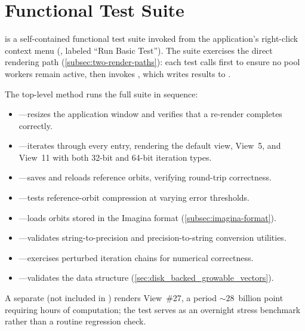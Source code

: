 \section{Functional Test Suite}
\label{subsec:crummy-test}

 is a self-contained functional test suite invoked
from the application's right-click context menu
(, labeled ``Run Basic Test'').  The suite
exercises the direct rendering path
(\cref{subsec:two-render-paths}): each test calls 
first to ensure no pool workers remain active, then invokes
, which writes results to .

The top-level  method runs the full suite in sequence:
\begin{itemize}
  \item {}---resizes the application window and
        verifies that a re-render completes correctly.
  \item {}---iterates through every
         entry, rendering the default view,
        View~5, and View~11 with both 32-bit and 64-bit iteration
        types.
  \item {}---saves and reloads reference orbits,
        verifying round-trip correctness.
  \item {}---tests reference-orbit
        compression at varying error thresholds.
  \item {}---loads orbits stored in the Imagina
        format (\cref{subsec:imagina-format}).
  \item {}---validates string-to-precision
        and precision-to-string conversion utilities.
  \item {}---exercises perturbed iteration
        chains for numerical correctness.
  \item {}---validates the
         data structure
        (\cref{sec:disk_backed_growable_vectors}).
\end{itemize}
A separate  (not included in
) renders View~\#27, a period ${\sim}28$~billion point
requiring hours of computation; the test serves as an overnight
stress benchmark rather than a routine regression check.

